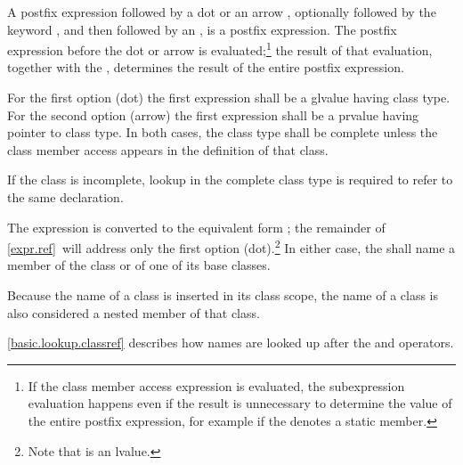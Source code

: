 \pnum
{}%
%
%
%
%
%
%
%
%
%
A postfix expression followed by a dot  or an arrow \tcode{->},
optionally followed by the keyword
, and then followed by an
, is a postfix expression. The postfix
expression before the dot or arrow is evaluated;\footnote{If the class member
access expression is evaluated, the subexpression evaluation happens even if the
result is unnecessary to determine
the value of the entire postfix expression, for example if the
 denotes a static member.}
the result of that evaluation, together with the
, determines the result of the entire postfix
expression.

\pnum
{}%
For the first option (dot) the first expression
shall be a glvalue having class type.
For the second option (arrow) the first expression
shall be a prvalue having pointer to class type.
In both cases, the class type shall be complete
unless the class member access appears in the definition of that class.
\begin{note}
If the class is incomplete, lookup in the complete class type
is required to refer to the same declaration.
\end{note}
The expression  is
converted to the equivalent form ; the remainder of
\ref{expr.ref}~will address only the first option (dot).\footnote{Note that
 is an lvalue.}
In either case, the
 shall name a member of the class or of one of
its base classes.
\begin{note}
Because the name of a class is inserted in its class scope,
the name of a class is also considered a nested
member of that class.
\end{note}
\begin{note}
\ref{basic.lookup.classref} describes how names are looked up after the
 and \tcode{->} operators.
\end{note}

